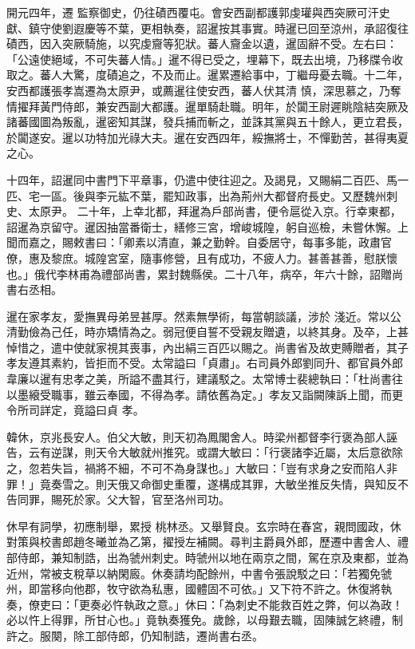 \begin{pinyinscope}
 開元四年，遷
 監察御史，仍往磧西覆屯。會安西副都護郭虔瓘與西突厥可汗史獻、鎮守使劉遐慶等不葉，更相執奏，詔暹按其事實。時暹已回至涼州，承詔復往磧西，因入突厥騎施，以究虔齎等犯狀。蕃人齎金以遺，暹固辭不受。左右曰：「公遠使絕域，不可失蕃人情。」暹不得已受之，埋幕下，既去出境，乃移牒令收取之。蕃人大驚，度磧追之，不及而止。暹累遷給事中，丁繼母憂去職。十二年，安西都護張孝嵩遷為太原尹，或薦暹往使安西，蕃人伏其清
 慎，深思慕之，乃奪情擢拜黃門侍郎，兼安西副大都護。暹單騎赴職。明年，於闐王尉遲眺陰結突厥及諸蕃國圖為叛亂，暹密知其謀，發兵捕而斬之，並誅其黨與五十餘人，更立君長，於闐遂安。暹以功特加光祿大夫。暹在安西四年，綏撫將士，不憚勤苦，甚得夷夏之心。



 十四年，詔暹同中書門下平章事，仍遣中使往迎之。及謁見，又賜絹二百匹、馬一匹、宅一區。後與李元紘不葉，罷知政事，出為荊州大都督府長史。又歷魏州刺史、太原尹。
 二十年，上幸北都，拜暹為戶部尚書，便令扈從入京。行幸東都，詔暹為京留守。暹因抽當番衛士，繕修三宮，增峻城隍，躬自巡檢，未嘗休懈。上聞而嘉之，賜敕書曰：「卿素以清直，兼之勤幹。自委居守，每事多能，政肅官僚，惠及黎庶。城隍宮室，隨事修營，且有成功，不疲人力。甚善甚善，慰朕懷也。」俄代李林甫為禮部尚書，累封魏縣侯。二十八年，病卒，年六十餘，詔贈尚書右丞相。



 暹在家孝友，愛撫異母弟昱甚厚。然素無學術，每當朝談議，涉於
 淺近。常以公清勤儉為己任，時亦矯情為之。弱冠便自誓不受親友贈遺，以終其身。及卒，上甚悼惜之，遣中使就家視其喪事，內出絹三百匹以賜之。尚書省及故吏賻贈者，其子孝友遵其素約，皆拒而不受。太常謚曰「貞肅」。右司員外郎劉同升、都官員外郎韋廉以暹有忠孝之美，所謚不盡其行，建議駁之。太常博士裴總執曰：「杜尚書往以墨縗受職事，雖云奉國，不得為孝。請依舊為定。」孝友又詣闕陳訴上聞，而更令所司詳定，竟謚曰貞
 孝。



 韓休，京兆長安人。伯父大敏，則天初為鳳閣舍人。時梁州都督李行褒為部人誣告，云有逆謀，則天令大敏就州推究。或謂大敏曰：「行褒諸李近屬，太后意欲除之，忽若失旨，禍將不細，不可不為身謀也。」大敏曰：「豈有求身之安而陷人非罪！」竟奏雪之。則天俄又命御史重覆，遂構成其罪，大敏坐推反失情，與知反不告同罪，賜死於家。父大智，官至洛州司功。



 休早有詞學，初應制舉，累授
 桃林丞。又舉賢良。玄宗時在春宮，親問國政，休對策與校書郎趙冬曦並為乙第，擢授左補闕。尋判主爵員外郎，歷遷中書舍人、禮部侍郎，兼知制誥，出為虢州刺史。時虢州以地在兩京之間，駕在京及東都，並為近州，常被支稅草以納閑廄。休奏請均配餘州，中書令張說駁之曰：「若獨免虢州，即當移向他郡，牧守欲為私惠，國體固不可依。」又下符不許之。休復將執奏，僚吏曰：「更奏必忤執政之意。」休曰：「為刺史不能救百姓之弊，何以為政！
 必以忤上得罪，所甘心也。」竟執奏獲免。歲餘，以母艱去職，固陳誠乞終禮，制許之。服闋，除工部侍郎，仍知制誥，遷尚書右丞。




\end{pinyinscope}
